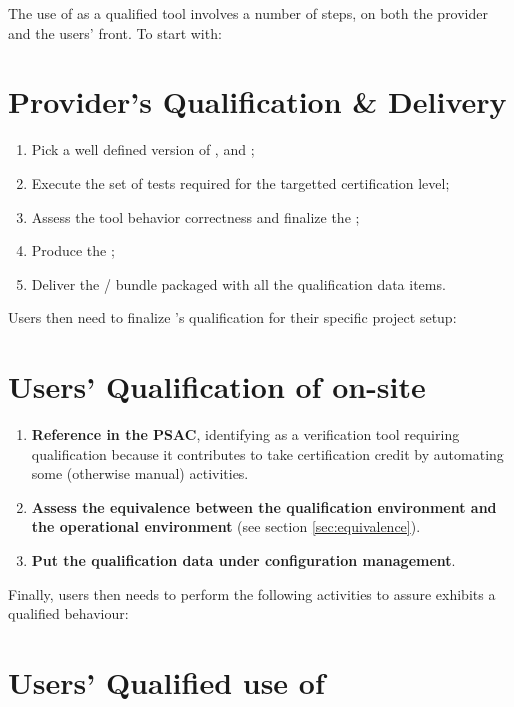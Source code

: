 \documentclass {report}
\begin{document}
The use of \xcov{} as a qualified tool involves a number of steps, on
both the provider and the users' front.
%
To start with:

\section{Provider's Qualification \& Delivery}

\begin{enumerate}
\item%
  Pick a well defined version of \xcov{}, \qemu{} and \gnatp{};
%
\item%
  Execute the set of tests required for the targetted certification level;
%
\item%
  Assess the tool behavior correctness and finalize the ;
%
\item%
  Produce the ;
%
\item%
  Deliver the \xcov{}/\qemu{} bundle packaged with all the
  qualification data items.
\end{enumerate}

Users then need to finalize \xcov{}'s qualification for their specific
project setup:

\section{Users' Qualification of \xcov{} on-site}

\begin{enumerate}
\item%
  \textbf{Reference \xcov{} in the PSAC}, identifying \xcov{} as a
  verification tool requiring qualification because it contributes to take
  certification credit by automating some (otherwise manual) activities.
%
\item%
  \textbf{Assess the equivalence between the qualification environment and the
    operational environment} (see section \ref{sec:equivalence}).
%
\item%
  \textbf{Put the qualification data under configuration management}.

\end{enumerate}

Finally, users then needs to perform the following activities to assure
\xcov{} exhibits a qualified behaviour:

\section{Users' Qualified use of \xcov{}}
\end{document}

